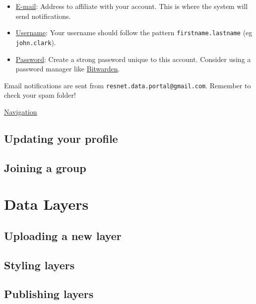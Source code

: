 \documentclass[
]{book}
\providecommand{\tightlist}{%
  \setlength{\itemsep}{0pt}\setlength{\parskip}{0pt}}
\begin{document}
\begin{itemize}
\tightlist
\item
  \underline{E-mail}: Address to affiliate with your account. This is where the system will send notifications.
\item
  \underline{Username}: Your username should follow the pattern \texttt{firstname.lastname} (eg \texttt{john.clark}).
\item
  \underline{Password}: Create a strong password unique to this account. Consider using a password manager like \href{https://bitwarden.com/}{Bitwarden}.
\end{itemize}

Email notifications are sent from \texttt{resnet.data.portal@gmail.com}. Remember to check your spam folder!

\protect\hyperlink{navigation}{Navigation}

\hypertarget{updating-your-profile}{%
\section{Updating your profile}\label{updating-your-profile}}

\hypertarget{joining-a-group}{%
\section{Joining a group}\label{joining-a-group}}

\hypertarget{data-layers}{%
\chapter{Data Layers}\label{data-layers}}

\hypertarget{uploading-a-new-layer}{%
\section{Uploading a new layer}\label{uploading-a-new-layer}}

\hypertarget{styling-layers}{%
\section{Styling layers}\label{styling-layers}}

\hypertarget{publishing-layers}{%
\section{Publishing layers}\label{publishing-layers}}
\end{document}
